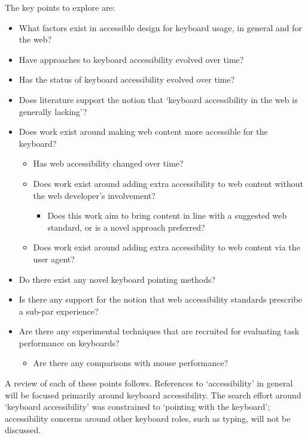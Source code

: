 \documentclass[11pt,openright,a4paper]{report}
\begin{document}
The key points to explore are:
\begin{itemize}
\item What factors exist in accessible design for keyboard usage, in general and for the web?
\item Have approaches to keyboard accessibility evolved over time?
\item Has the status of keyboard accessibility evolved over time?
\item Does literature support the notion that `keyboard accessibility in the web is generally lacking'?
\item Does work exist around making web content more accessible for the keyboard?
\begin{itemize}
\item Has web accessibility changed over time?
\item Does work exist around adding extra accessibility to web content without the web developer's involvement?
\begin{itemize}
\item Does this work aim to bring content in line with a suggested web standard, or is a novel approach preferred?
\end{itemize}
\item Does work exist around adding extra accessibility to web content via the user agent?
\end{itemize}
\item Do there exist any novel keyboard pointing methods?
\item Is there any support for the notion that web accessibility standards prescribe a sub-par experience?
\item Are there any experimental techniques that are recruited for evaluating task performance on keyboards?
\begin{itemize}
\item Are there any comparisons with mouse performance?
\end{itemize}
\end{itemize}

A review of each of these points follows. References to `accessibility' in general will be focused primarily around keyboard accessibility. The search effort around `keyboard accessibility' was constrained to `pointing with the keyboard'; accessibility concerns around other keyboard roles, such as typing, will not be discussed.
\end{document}
